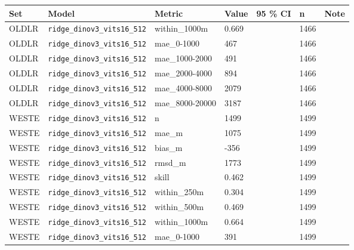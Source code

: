 \begin{center}{\scriptsize\setlength{\tabcolsep}{3pt}
\begin{tabular}{lp{2.4cm}llllp{7.3cm}}
\toprule
Set & Model & Metric & Value & 95 \% CI & n & Note \\
\midrule
OLDLR & \texttt{ridge\_\allowbreak{}dinov3\_\allowbreak{}vits16\_\allowbreak{}512} & within\_1000m & 0.669 &  & 1466 &  \\
OLDLR & \texttt{ridge\_\allowbreak{}dinov3\_\allowbreak{}vits16\_\allowbreak{}512} & mae\_0-1000 & 467 &  & 1466 &  \\
OLDLR & \texttt{ridge\_\allowbreak{}dinov3\_\allowbreak{}vits16\_\allowbreak{}512} & mae\_1000-2000 & 491 &  & 1466 &  \\
OLDLR & \texttt{ridge\_\allowbreak{}dinov3\_\allowbreak{}vits16\_\allowbreak{}512} & mae\_2000-4000 & 894 &  & 1466 &  \\
OLDLR & \texttt{ridge\_\allowbreak{}dinov3\_\allowbreak{}vits16\_\allowbreak{}512} & mae\_4000-8000 & 2079 &  & 1466 &  \\
OLDLR & \texttt{ridge\_\allowbreak{}dinov3\_\allowbreak{}vits16\_\allowbreak{}512} & mae\_8000-20000 & 3187 &  & 1466 &  \\
WESTE & \texttt{ridge\_\allowbreak{}dinov3\_\allowbreak{}vits16\_\allowbreak{}512} & n & 1499 &  & 1499 &  \\
WESTE & \texttt{ridge\_\allowbreak{}dinov3\_\allowbreak{}vits16\_\allowbreak{}512} & mae\_m & 1075 &  & 1499 &  \\
WESTE & \texttt{ridge\_\allowbreak{}dinov3\_\allowbreak{}vits16\_\allowbreak{}512} & bias\_m & -356 &  & 1499 &  \\
WESTE & \texttt{ridge\_\allowbreak{}dinov3\_\allowbreak{}vits16\_\allowbreak{}512} & rmsd\_m & 1773 &  & 1499 &  \\
WESTE & \texttt{ridge\_\allowbreak{}dinov3\_\allowbreak{}vits16\_\allowbreak{}512} & skill & 0.462 &  & 1499 &  \\
WESTE & \texttt{ridge\_\allowbreak{}dinov3\_\allowbreak{}vits16\_\allowbreak{}512} & within\_250m & 0.304 &  & 1499 &  \\
WESTE & \texttt{ridge\_\allowbreak{}dinov3\_\allowbreak{}vits16\_\allowbreak{}512} & within\_500m & 0.469 &  & 1499 &  \\
WESTE & \texttt{ridge\_\allowbreak{}dinov3\_\allowbreak{}vits16\_\allowbreak{}512} & within\_1000m & 0.664 &  & 1499 &  \\
WESTE & \texttt{ridge\_\allowbreak{}dinov3\_\allowbreak{}vits16\_\allowbreak{}512} & mae\_0-1000 & 391 &  & 1499 &  \\

\end{tabular}}
\end{center}
